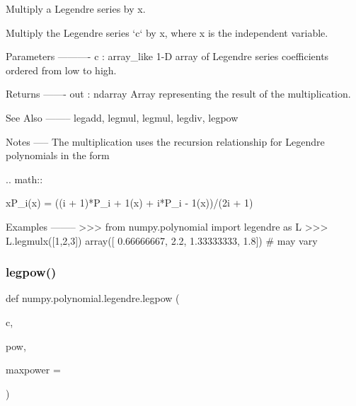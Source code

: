 \begin{DoxyVerb}Multiply a Legendre series by x.

Multiply the Legendre series `c` by x, where x is the independent
variable.


Parameters
----------
c : array_like
    1-D array of Legendre series coefficients ordered from low to
    high.

Returns
-------
out : ndarray
    Array representing the result of the multiplication.

See Also
--------
legadd, legmul, legmul, legdiv, legpow

Notes
-----
The multiplication uses the recursion relationship for Legendre
polynomials in the form

.. math::

  xP_i(x) = ((i + 1)*P_{i + 1}(x) + i*P_{i - 1}(x))/(2i + 1)

Examples
--------
>>> from numpy.polynomial import legendre as L
>>> L.legmulx([1,2,3])
array([ 0.66666667, 2.2, 1.33333333, 1.8]) # may vary\end{DoxyVerb}
 \mbox{\label{namespacenumpy_1_1polynomial_1_1legendre_a3b8ae0e57f1fa028b97bbf0c360e3f84}} 
\subsubsection{\texorpdfstring{legpow()}{legpow()}}
{\footnotesize\ttfamily def numpy.\+polynomial.\+legendre.\+legpow (\begin{DoxyParamCaption}\item[{}]{c,  }\item[{}]{pow,  }\item[{}]{maxpower = {} }\end{DoxyParamCaption})}

